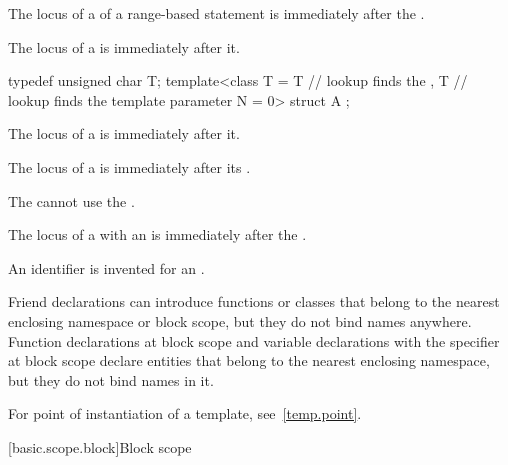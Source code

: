 \pnum
The locus of a 
of a range-based  statement
is immediately after the .

\pnum
The locus of a  is immediately after it.
\begin{example}
\begin{codeblock}
typedef unsigned char T;
template<class T
  = T               // lookup finds the 
  , T               // lookup finds the template parameter
    N = 0> struct A { };
\end{codeblock}
\end{example}

\pnum
The locus of a 
is immediately after it.

\pnum
The locus of a 
is immediately after its .
\begin{note}
The  cannot use
the .
\end{note}

\pnum
The locus of a 
with an 
is immediately after the .
\begin{note}
An identifier is invented
for an .
\end{note}

\pnum
\begin{note}
Friend declarations can introduce functions or classes
that belong to the nearest enclosing namespace or block scope,
but they do not bind names anywhere.
Function declarations at block scope and
variable declarations with the  specifier at block scope
declare entities
that belong to the nearest enclosing namespace,
but they do not bind names in it.
\end{note}

\pnum
\begin{note}
For point of instantiation of a template, see~\ref{temp.point}.
\end{note}

[basic.scope.block]{Block scope}

%

